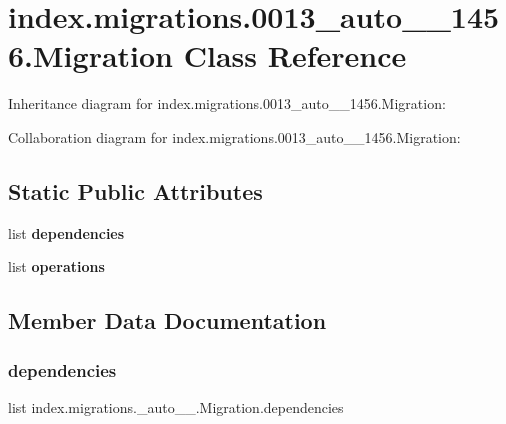 \hypertarget{classindex_1_1migrations_1_10013__auto__20171024__1456_1_1Migration}{}\section{index.\+migrations.0013\+\_\+auto\+\_\+\_\+1456.Migration Class Reference}
\label{classindex_1_1migrations_1_10013__auto__20171024__1456_1_1Migration}


Inheritance diagram for index.\+migrations.0013\+\_\+auto\+\_\+\_\+1456.Migration\+:


Collaboration diagram for index.\+migrations.0013\+\_\+auto\+\_\+\_\+1456.Migration\+:
\subsection*{Static Public Attributes}
\begin{DoxyCompactItemize}
\item 
list {\bfseries dependencies}
\item 
list {\bfseries operations}
\end{DoxyCompactItemize}


\subsection{Member Data Documentation}
\mbox{\label{classindex_1_1migrations_1_10013__auto__20171024__1456_1_1Migration_a80716aedd6b89ce9b0d36ae7c20cc0c9}} 
\subsubsection{\texorpdfstring{dependencies}{dependencies}}
{\footnotesize\ttfamily list index.\+migrations.\+\_\+auto\+\_\+\_.\+Migration.\+dependencies\hspace{0.3cm}{\ttfamily [static]}}

